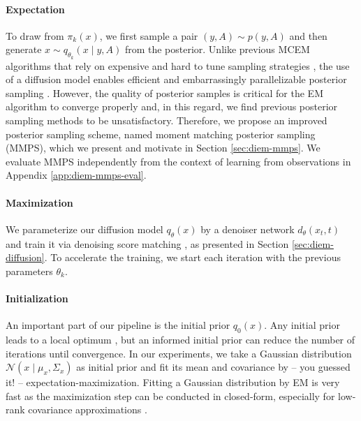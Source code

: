 \paragraph{Expectation} To draw from $\pi_k(x)$, we first sample a pair $(y, A) \sim p(y, A)$ and then generate $x \sim q_{\theta_k}(x \mid y, A)$ from the posterior. Unlike previous MCEM algorithms that rely on expensive and hard to tune sampling strategies \cite{levine2001implementations, caffo2005ascentbased, jank2006em, ruth2024review}, the use of a diffusion model enables efficient and embarrassingly parallelizable posterior sampling \cite{chung2023diffusion, song2023pseudoinverseguided, rozet2023scorebased}. However, the quality of posterior samples is critical for the EM algorithm to converge properly \cite{levine2001implementations, caffo2005ascentbased, jank2006em, ruth2024review} and, in this regard, we find previous posterior sampling methods \cite{chung2023diffusion, song2023pseudoinverseguided, rozet2023scorebased, boys2023tweedie, zhu2023denoising} to be unsatisfactory. Therefore, we propose an improved posterior sampling scheme, named moment matching posterior sampling (MMPS), which we present and motivate in Section \ref{sec:diem-mmps}. We evaluate MMPS independently from the context of learning from observations in Appendix \ref{app:diem-mmps-eval}.

\paragraph{Maximization} We parameterize our diffusion model $q_\theta(x)$ by a denoiser network $d_\theta(x_t, t)$ and train it via denoising score matching \cite{hyvarinen2005estimation, vincent2011connection}, as presented in Section \ref{sec:diem-diffusion}. To accelerate the training, we start each iteration with the previous parameters $\theta_k$.

\paragraph{Initialization} An important part of our pipeline is the initial prior $q_0(x)$. Any initial prior leads to a local optimum \cite{wu1983convergence, mclachlan2007em, balakrishnan2017statistical}, but an informed initial prior can reduce the number of iterations until convergence. In our experiments, we take a Gaussian distribution $\mathcal{N}(x \mid \mu_x, \Sigma_x)$ as initial prior and fit its mean and covariance by -- you guessed it! -- expectation-maximization. Fitting a Gaussian distribution by EM is very fast as the maximization step can be conducted in closed-form, especially for low-rank covariance approximations \cite{tipping1999mixtures}.

